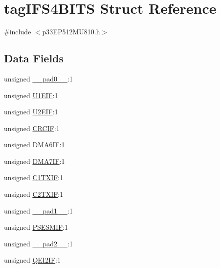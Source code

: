 \hypertarget{structtag_i_f_s4_b_i_t_s}{}\section{tag\+I\+F\+S4\+B\+I\+TS Struct Reference}
\label{structtag_i_f_s4_b_i_t_s}


{\ttfamily \#include $<$p33\+E\+P512\+M\+U810.\+h$>$}

\subsection*{Data Fields}
\begin{DoxyCompactItemize}
\item 
unsigned \hyperlink{structtag_i_f_s4_b_i_t_s_adf71f3d8410c1f1dbbc96680a92c49af}{\+\_\+\+\_\+pad0\+\_\+\+\_\+}\+:1
\item 
unsigned \hyperlink{structtag_i_f_s4_b_i_t_s_a87fabcfad76343d2b1c6b9d5e9aab876}{U1\+E\+IF}\+:1
\item 
unsigned \hyperlink{structtag_i_f_s4_b_i_t_s_a039a139c79e4a59ac9b31b0a29265b9a}{U2\+E\+IF}\+:1
\item 
unsigned \hyperlink{structtag_i_f_s4_b_i_t_s_a68c6a52753e07aa84f3cbe4fe48acac3}{C\+R\+C\+IF}\+:1
\item 
unsigned \hyperlink{structtag_i_f_s4_b_i_t_s_a1cd8d3b63a0c4b8431c8d07185bb57c9}{D\+M\+A6\+IF}\+:1
\item 
unsigned \hyperlink{structtag_i_f_s4_b_i_t_s_a6ae53cee1a828f4056020e0c0518bc66}{D\+M\+A7\+IF}\+:1
\item 
unsigned \hyperlink{structtag_i_f_s4_b_i_t_s_a95330755b04eb1dd6320e85f743df7bc}{C1\+T\+X\+IF}\+:1
\item 
unsigned \hyperlink{structtag_i_f_s4_b_i_t_s_a9ba9ddff8026c66cba3d9195728cd8bd}{C2\+T\+X\+IF}\+:1
\item 
unsigned \hyperlink{structtag_i_f_s4_b_i_t_s_acaf2d0924a107ec6e8d2e31febaf66f9}{\+\_\+\+\_\+pad1\+\_\+\+\_\+}\+:1
\item 
unsigned \hyperlink{structtag_i_f_s4_b_i_t_s_a7422a9c0d3cebf8a2fb1746bd1de251d}{P\+S\+E\+S\+M\+IF}\+:1
\item 
unsigned \hyperlink{structtag_i_f_s4_b_i_t_s_a4d97cc5f7d51d22fc2bf3eab35c9cb7f}{\+\_\+\+\_\+pad2\+\_\+\+\_\+}\+:1
\item 
unsigned \hyperlink{structtag_i_f_s4_b_i_t_s_a49933ea82392cff97b9af035be19552d}{Q\+E\+I2\+IF}\+:1
\end{DoxyCompactItemize}



